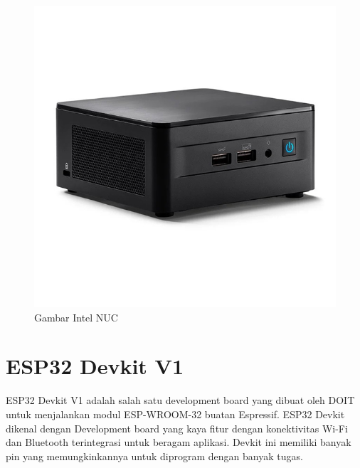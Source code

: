 \begin{figure}[H]
  \centering

  \includegraphics[scale=0.3]{gambar/INTEL-NUC-RNUC12WSHI30000-1.jpg}

  \caption{Gambar Intel NUC}
  \label{fig:roketluarangkasa}
\end{figure}

\section{ESP32 Devkit V1}

ESP32 Devkit V1 adalah salah satu development board yang dibuat oleh DOIT untuk menjalankan modul ESP-WROOM-32 buatan Espressif. ESP32 Devkit dikenal dengan Development board yang kaya fitur dengan konektivitas Wi-Fi dan Bluetooth terintegrasi untuk beragam aplikasi. Devkit ini memiliki banyak pin yang memungkinkannya untuk diprogram dengan banyak tugas.

